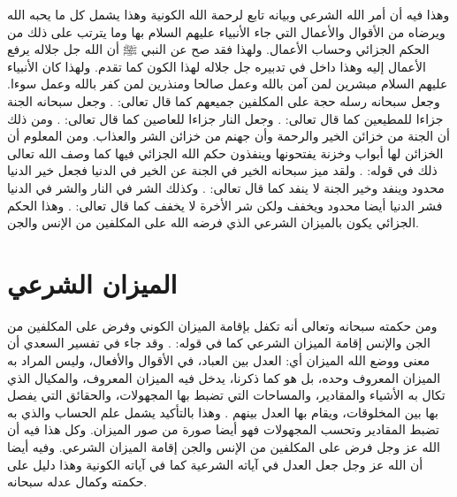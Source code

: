 وهذا فيه أن أمر الله الشرعي وبيانه تابع لرحمة الله الكونية وهذا يشمل كل ما يحبه الله ويرضاه من الأقوال والأعمال التي جاء الأنبياء عليهم السلام بها وما يترتب على ذلك من الحكم الجزائي وحساب الأعمال. ولهذا فقد صح عن النبي ﷺ أن الله جل جلاله يرفع الأعمال إليه وهذا داخل في تدبيره جل جلاله لهذا الكون كما تقدم. ولهذا كان الأنبياء عليهم السلام مبشرين لمن آمن بالله وعمل صالحا ومنذرين لمن كفر بالله وعمل سوءا. وجعل سبحانه رسله حجة على المكلفين جميعهم كما قال تعالى: \quranayah*[4][165]{\footnotesize \surahname*[4]}. وجعل سبحانه الجنة جزاءا للمطيعين كما قال تعالى: 
\quranayah*[3][133]{\footnotesize \surahname*[3]}.
وجعل النار جزاءا للعاصين كما قال تعالى: 
\quranayah*[3][131]{\footnotesize \surahname*[3]}. ومن ذلك أن الجنة من خزائن الخير والرحمة وأن جهنم من خزائن الشر والعذاب. ومن المعلوم أن الخزائن لها أبواب وخزنة يفتحونها وينفذون حكم الله الجزائي فيها كما وصف الله تعالى ذلك في قوله: 
\quranayah*[39][71-74]{\footnotesize \surahname*[39]}. ولقد ميز سبحانه الخير في الجنة عن الخير في الدنيا فجعل خير الدنيا محدود وينفد وخير الجنة لا ينفد كما قال تعالى: 
\quranayah*[16][96]{\footnotesize \surahname*[16]}.
وكذلك الشر في النار والشر في الدنيا فشر الدنيا أيضا محدود ويخفف ولكن شر الأخرة لا يخفف كما قال تعالى: 
\quranayah*[2][162]{\footnotesize \surahname*[2]}. وهذا الحكم الجزائي يكون بالميزان الشرعي الذي فرضه الله على المكلفين من الإنس والجن. 


\section{الميزان الشرعي}

ومن حكمته سبحانه وتعالى أنه تكفل بإقامة الميزان الكوني وفرض على المكلفين من الجن والإنس إقامة الميزان الشرعي كما في قوله:
\quranayah*[55][7-9]{\footnotesize \surahname*[55]}. وقد جاء في تفسير السعدي أن معنى ووضع الله الميزان أي: العدل بين العباد، في الأقوال والأفعال، وليس المراد به الميزان المعروف وحده، بل هو كما ذكرنا، يدخل فيه الميزان المعروف، والمكيال الذي تكال به الأشياء والمقادير، والمساحات التي تضبط بها المجهولات، والحقائق التي يفصل بها بين المخلوقات، ويقام بها العدل بينهم \cite{tafsir_Saadi}. وهذا بالتأكيد يشمل علم الحساب والذي به تضبط المقادير وتحسب المجهولات فهو أيضا صورة من صور الميزان. وكل هذا فيه أن الله عز وجل فرض على المكلفين من الإنس والجن إقامة الميزان الشرعي. وفيه أيضا أن الله عز وجل جعل العدل في آياته الشرعية كما في آياته الكونية وهذا دليل على حكمته وكمال عدله سبحانه.

